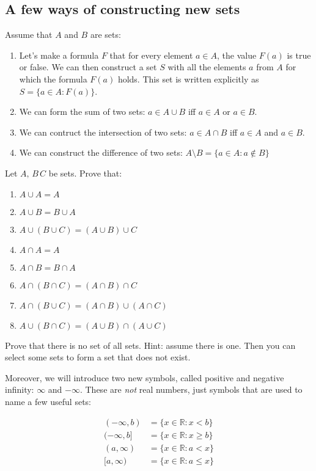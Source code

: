 \subsection{A few ways of constructing new sets}
\noindent Assume that $A$ and $B$ are sets:
\begin{enumerate}
	\item Let's make a formula $F$ that for every element $a\in A$, the value 
		$F(a)$ is true or false. We can then construct a set $S$ with all the elements $a$ from $A$ for which 
		the formula $F(a)$ holds. This set is written explicitly as $S=\{a\in A : F(a)\}$.
	\item We can form the sum of two sets: $a \in A\cup B$ iff $a\in A$ or $a\in B$.
	\item We can contruct the intersection of two sets: $a\in A\cap B$ iff $a\in A$ and $a \in B$.
	\item We can construct the difference of two sets: $A\setminus B = \{a \in A : a\notin B\}$
\end{enumerate}

\begin{prob}
	Let $A,\,B\,C$ be sets. Prove that: 
	\begin{enumerate}
		\item $A\cup A=A$
		\item $A\cup B=B\cup A$
		\item $A\cup (B\cup C)=(A\cup B)\cup C$
		\item $A\cap A=A$
		\item $A\cap B=B\cap A$
		\item $A\cap (B\cap C)=(A\cap B)\cap C$
		\item $A\cap (B\cup C)=(A\cap B)\cup (A\cap C)$
		\item $A\cup (B\cap C)=(A\cup B)\cap (A\cup C)$
	\end{enumerate}
\end{prob}

\begin{prob}
	Prove that there is no set of all sets. Hint: assume there is one. Then you can select some sets to form a set that does not exist.
\end{prob}

\noindent Moreover, we will introduce two new symbols, called positive and negative infinity: 
$\infty$ and $-\infty$. 
These are \textit{not} real numbers, just symbols that are used to name a few useful sets:

\begin{align*}
	(-\infty,b) &= \{x\in \mathbb R : x < b\}\\
	(-\infty,b] &= \{x\in \mathbb R : x \ge b\}\\
	(a,\infty)  &= \{x\in \mathbb R : a < x\}\\
	[a,\infty)  &= \{x\in \mathbb R : a \le x\}
\end{align*}

